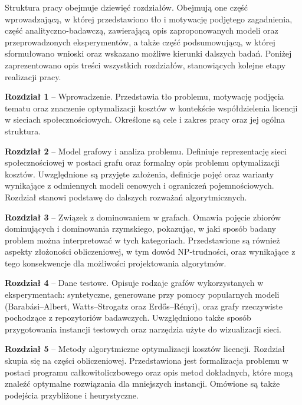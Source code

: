Struktura pracy obejmuje dziewięć rozdziałów. Obejmują one część wprowadzającą, w której przedstawiono tło i motywację podjętego zagadnienia, część analityczno-badawczą, zawierającą opis zaproponowanych modeli oraz przeprowadzonych eksperymentów, a także część podsumowującą, w której sformułowano wnioski oraz wskazano możliwe kierunki dalszych badań. Poniżej zaprezentowano opis treści wszystkich rozdziałów, stanowiących kolejne etapy realizacji pracy. \\

\begin{description}
  \item \textbf{Rozdział 1} -- Wprowadzenie. Przedstawia tło problemu, motywację podjęcia tematu oraz znaczenie optymalizacji kosztów w kontekście współdzielenia licencji w sieciach społecznościowych. Określone są cele i zakres pracy oraz jej ogólna struktura.

  \item \textbf{Rozdział 2} -- Model grafowy i analiza problemu. Definiuje reprezentację sieci społecznościowej w postaci grafu oraz formalny opis problemu optymalizacji kosztów. Uwzględnione są przyjęte założenia, definicje pojęć oraz warianty wynikające z odmiennych modeli cenowych i ograniczeń pojemnościowych. Rozdział stanowi podstawę do dalszych rozważań algorytmicznych.

  \item \textbf{Rozdział 3} -- Związek z dominowaniem w grafach. Omawia pojęcie zbiorów dominujących i dominowania rzymskiego, pokazując, w jaki sposób badany problem można interpretować w tych kategoriach. Przedstawione są również aspekty złożoności obliczeniowej, w tym dowód NP-trudności, oraz wynikające z tego konsekwencje dla możliwości projektowania algorytmów.

  \item \textbf{Rozdział 4} -- Dane testowe. Opisuje rodzaje grafów wykorzystanych w eksperymentach: syntetyczne, generowane przy pomocy popularnych modeli (Barabási--Albert, Watts--Strogatz oraz Erdős--Rényi), oraz grafy rzeczywiste pochodzące z repozytoriów badawczych. Uwzględniono także sposób przygotowania instancji testowych oraz narzędzia użyte do wizualizacji sieci.

  \item \textbf{Rozdział 5} -- Metody algorytmiczne optymalizacji kosztów licencji. Rozdział skupia się na części obliczeniowej. Przedstawiona jest formalizacja problemu w postaci programu całkowitoliczbowego oraz opis metod dokładnych, które mogą znaleźć optymalne rozwiązania dla mniejszych instancji. Omówione są także podejścia przybliżone i heurystyczne.


\end{description}
